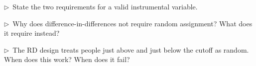 \begin{reflect}
$\triangleright$~State the two requirements for a valid instrumental variable.

\smallskip
$\triangleright$~Why does difference-in-differences not require random assignment? What does it require instead?

\smallskip
$\triangleright$~The RD design treats people just above and just below the cutoff as random. When does this work? When does it fail?
\end{reflect}
